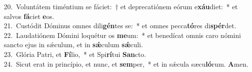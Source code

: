 {20.~}Voluntátem timéntium se fáciet:~† et deprecatiónem eórum e\textbf{xáu}diet:~* et salvos \textbf{fá}ciet \textbf{e}os.\\
{21.~}Custódit Dóminus omnes dili\textbf{gén}tes se:~* et omnes pecca\textbf{tó}res di\textbf{spér}det.\\
{22.~}Laudatiónem Dómini loquétur os \textbf{me}um:~* et benedícat omnis caro nómini sancto ejus in sǽculum, et in \textbf{sǽ}culum \textbf{sǽ}culi.\\
{23.~}Glória Patri, et \textbf{Fí}lio,~* et Spi\textbf{rí}tui \textbf{San}cto.\\
{24.~}Sicut erat in princípio, et nunc, et \textbf{sem}per,~* et in sǽcula sæcu\textbf{ló}rum. \textbf{A}men.\\
